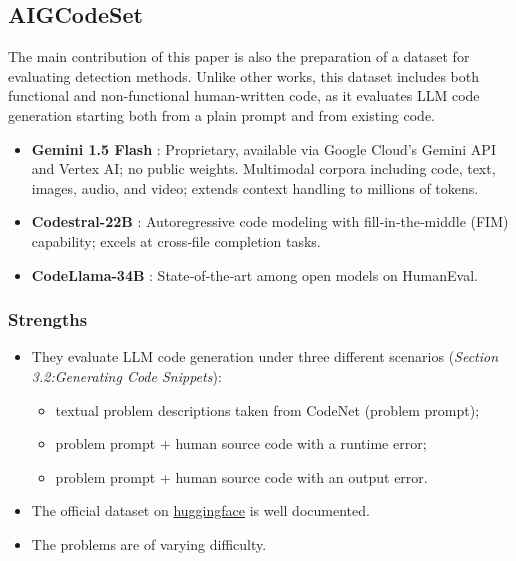 \subsection{AIGCodeSet}
The main contribution of this paper is also the preparation 
of a dataset for evaluating detection methods. Unlike other 
works, this dataset includes both functional and non-functional 
human-written code, as it evaluates LLM code generation starting 
both from a plain prompt and from existing code.


\begin{itemize}
    \item \textbf{Gemini 1.5 Flash} \cite{team2024gemini} : 
    Proprietary, available via Google Cloud’s Gemini API and Vertex AI; 
    no public weights. Multimodal corpora including code, text, images, 
    audio, and video; extends context handling to millions of tokens. 
    \item \textbf{Codestral-22B} \cite{mistral-codestral-2024} : 
    Autoregressive code modeling with fill‑in‑the‑middle (FIM) 
    capability; excels at cross‑file completion tasks.
    \item \textbf{CodeLlama-34B} \cite{roziere2023code} :
    State‑of‑the‑art among open models on HumanEval.
\end{itemize}





\subsubsection*{Strengths}
\begin{itemize}
    \item They evaluate LLM code generation under three different scenarios 
    {(\scriptsize\textit{Section 3.2:Generating Code Snippets})}:
    \begin{itemize}
        \item textual problem descriptions taken from CodeNet (problem prompt);
        \item problem prompt + human source code with a runtime error;
        \item problem prompt + human source code with an output error.
    \end{itemize}
    \item The official dataset on 
    \href{{https://huggingface.co/datasets/basakdemirok/AIGCodeSet}}{huggingface}
    is well documented. 
    \item The problems are of varying difficulty.
\end{itemize}



